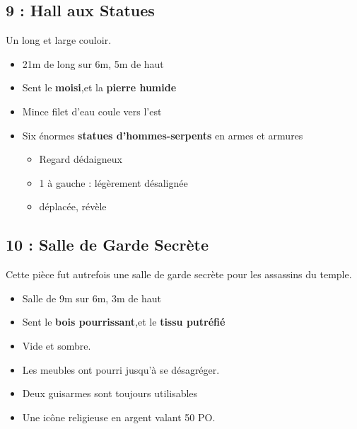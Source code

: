 \subsection{9 : Hall aux Statues}\label{n2:s9}
Un long et large couloir.
\begin{itemize}
  \item 21m de long sur 6m, 5m de haut
  \item Sent le \textbf{moisi},et la \textbf{pierre humide}
  \item Mince filet d'eau coule vers l'est
  \item Six énormes \textbf{statues d'hommes-serpents} en armes et armures
  \begin{itemize}
    \item Regard dédaigneux
    \item 1\iere{} à gauche : légèrement désalignée
    \item déplacée, révèle \textbf{}
  \end{itemize}
\end{itemize}

\vfill
\subsection{10 : Salle de Garde Secrète}\label{n2:s10}
Cette pièce fut autrefois une salle de garde secrète pour les assassins du temple.

\begin{itemize}
  \item Salle de 9m sur 6m, 3m de haut
  \item Sent le \textbf{bois pourrissant},et le \textbf{tissu putréfié}
  \item Vide et sombre.
  \item Les meubles ont pourri jusqu'à se désagréger.
  \item Deux guisarmes sont toujours utilisables
  \item Une icône religieuse en argent valant 50 PO.
\end{itemize}

\vfill\pagebreak
